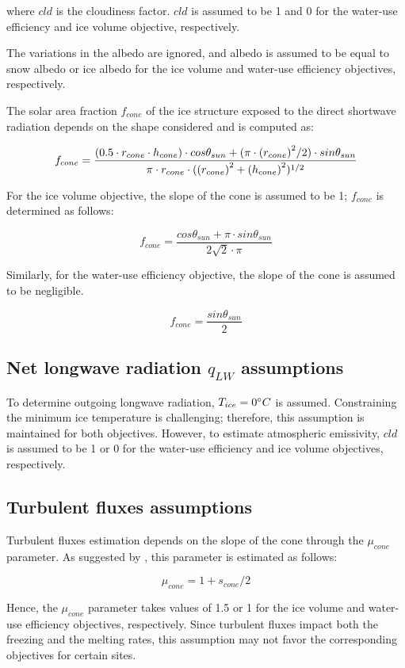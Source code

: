 where $cld$ is the cloudiness factor. $cld$ is assumed to be 1 and 0 for the water-use efficiency and ice volume
objective, respectively.

The variations in the albedo are ignored, and albedo is assumed to be equal to snow albedo or ice albedo for the
ice volume and water-use efficiency objectives, respectively.

The solar area fraction $f_{cone}$ of the ice structure exposed to the direct shortwave radiation depends on the
shape considered and is computed as:

\begin{equation}
		f_{cone} =\frac{(0.5 \cdot r_{cone} \cdot h_{cone}) \cdot cos \theta_{sun} +(\pi \cdot
			{(r_{cone})}^2/2) \cdot sin \theta_{sun} }{\pi \cdot r_{cone} \cdot ({(r_{cone})}^2+{(h_{cone})}^2)^{1/2}}\\
\end{equation}

For the ice volume objective, the slope of the cone is assumed to be 1; $f_{cone}$ is determined as follows:

\begin{equation}
		f_{cone} =\frac{ cos \theta_{sun} + \pi \cdot sin \theta_{sun} }{2\sqrt{2} \cdot \pi }
\end{equation}

Similarly, for the water-use efficiency objective, the slope of the cone is assumed to be negligible.

\begin{equation}
		f_{cone} =\frac{ sin \theta_{sun} }{2 }
\end{equation}

\subsection{Net longwave radiation \texorpdfstring{$q_{LW}$}{Lg} assumptions} 

To determine outgoing longwave radiation, $T_{ice} = 0 ^{\circ} C$ is assumed. Constraining the minimum ice
temperature is challenging; therefore, this assumption is maintained for both objectives. However, to
estimate atmospheric emissivity, $cld$ is assumed to be 1 or 0 for the water-use efficiency and ice volume
objectives, respectively.

\subsection{Turbulent fluxes assumptions} 

Turbulent fluxes estimation depends on the slope of the cone through the $\mu_{cone}$ parameter. As suggested 
by \citet{oerlemansBriefCommunicationGrowth2021}, this parameter is estimated as follows:

\begin{equation}
  \mu_{cone} =1 + s_{cone}/2
\end{equation}

Hence, the $\mu_{cone}$ parameter takes values of 1.5 or 1 for the ice volume and water-use efficiency
objectives, respectively.  Since turbulent fluxes impact both the freezing and the melting rates, this assumption
may not favor the corresponding objectives for certain sites.
